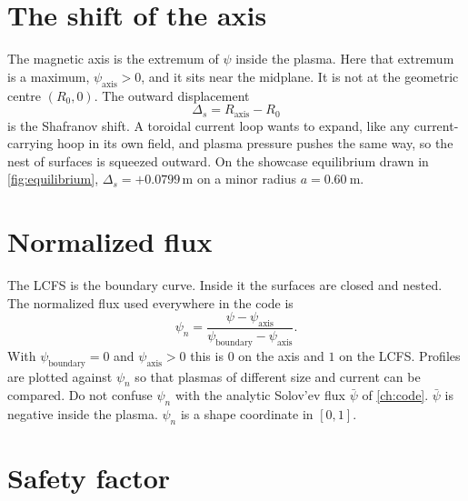 \documentclass[11pt,a4paper,oneside,openany]{book}
\numberwithin{equation}{chapter}
\newcommand{\psin}{\psi_{n}}
\newcommand{\psibar}{\bar{\psi}}
\theoremstyle{definition}
\begin{document}
\section{The shift of the axis}

The magnetic axis is the extremum of \(\psi\) inside the plasma. Here that extremum is a maximum, \(\psi_{\mathrm{axis}}>0\), and it sits near the midplane. It is not at the geometric centre \((R_{0},0)\). The outward displacement
\begin{equation}
\label{eq:shift}
\Delta_{s}=R_{\mathrm{axis}}-R_{0}
\end{equation}
is the Shafranov shift. A toroidal current loop wants to expand, like any current-carrying hoop in its own field, and plasma pressure pushes the same way, so the nest of surfaces is squeezed outward. On the showcase equilibrium drawn in \cref{fig:equilibrium}, \(\Delta_{s}=+0.0799\,\mathrm{m}\) on a minor radius \(a=\qty{0.60}{\metre}\).

\section{Normalized flux}

The LCFS is the boundary curve. Inside it the surfaces are closed and nested. The normalized flux used everywhere in the code is
\begin{equation}
\label{eq:psin}
\psin=\frac{\psi-\psi_{\mathrm{axis}}}{\psi_{\mathrm{boundary}}-\psi_{\mathrm{axis}}}.
\end{equation}
With \(\psi_{\mathrm{boundary}}=0\) and \(\psi_{\mathrm{axis}}>0\) this is \(0\) on the axis and \(1\) on the LCFS. Profiles are plotted against \(\psin\) so that plasmas of different size and current can be compared. Do not confuse \(\psin\) with the analytic Solov'ev flux \(\psibar\) of \cref{ch:code}. \(\psibar\) is negative inside the plasma. \(\psin\) is a shape coordinate in \([0,1]\).

\section{Safety factor}
\end{document}
